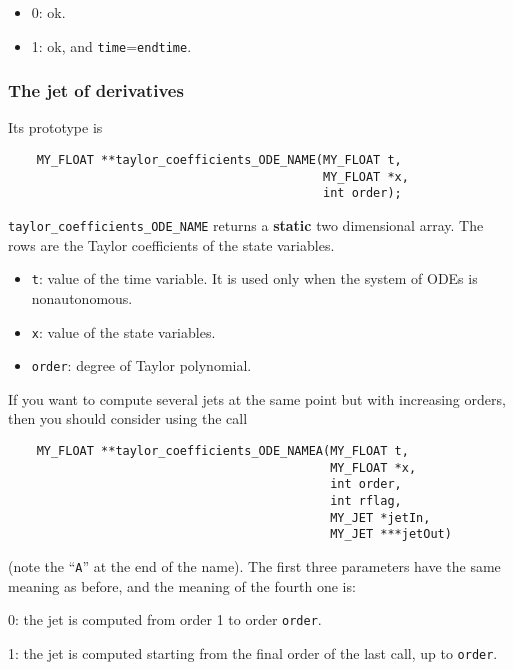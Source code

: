 \documentclass[10pt]{article}
\theoremstyle{remark}
\begin{document}
\begin{itemize}
\item 0: ok.
\item 1: ok, and {\tt time}={\tt endtime}.
\end{itemize}


\subsubsection*{The jet of derivatives}
Its prototype is
\begin{verbatim}
    MY_FLOAT **taylor_coefficients_ODE_NAME(MY_FLOAT t,
                                            MY_FLOAT *x,
                                            int order);
\end{verbatim}
\verb+taylor_coefficients_ODE_NAME+ returns a {\bf static} two
dimensional array. The rows are the Taylor coefficients of the state
variables.

\vspace{3mm}
\begin{itemize}
  \item{\verb+t+: value of the time variable. It is used only when the
    system of ODEs is nonautonomous.}
  \item{\verb+x+: value of the state variables.}
  \item{\verb+order+: degree of Taylor polynomial.}
\end{itemize}

If you want to compute several jets at the same point but with
increasing orders, then you should consider using the call
\begin{verbatim}
    MY_FLOAT **taylor_coefficients_ODE_NAMEA(MY_FLOAT t,
                                             MY_FLOAT *x,
                                             int order,
                                             int rflag,
                                             MY_JET *jetIn, 
                                             MY_JET ***jetOut)
\end{verbatim}
(note the ``{\tt A}'' at the end of the name). The first three
parameters have the same meaning as before, and the meaning of the
fourth one is:
\begin{description}
  \item 0: the jet is computed from order 1 to order {\tt order}.
  \item 1: the jet is computed starting from the final order of the
    last call, up to {\tt order}.
\end{description}
\end{document}

